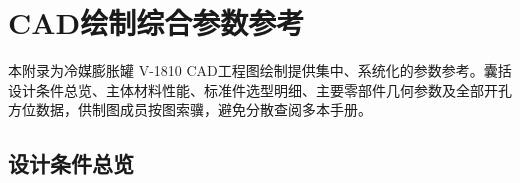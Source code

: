 
\chapter{CAD绘制综合参数参考}

本附录为冷媒膨胀罐 V-1810 CAD工程图绘制提供集中、系统化的参数参考。囊括设计条件总览、主体材料性能、标准件选型明细、主要零部件几何参数及全部开孔方位数据，供制图成员按图索骥，避免分散查阅多本手册。

\section{设计条件总览}
\label{sec:cad-design-conditions}

